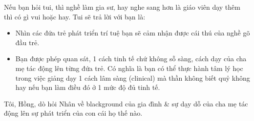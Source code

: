\documentclass[12pt,oneside]{book}
\begin{document}
Nếu bạn hỏi tui, thì nghề làm gia sư, hay nghe sang hơn là giáo viên dạy thêm thì có gì vui hoặc hay. Tui sẽ trả lời với bạn là:
\begin{itemize}
	\item Nhìn các đứa trẻ phát triển trí tuệ bạn sẽ cảm nhận được cái thú của nghề gõ đầu trẻ.
	
	\item Bạn được phép quan sát, 1 cách tinh tế chứ không sỗ sàng, cách dạy của cha mẹ tác động lên từng đứa trẻ. Có nghĩa là bạn có thể thực hành tâm lý học trong việc giảng dạy 1 cách lâm sàng (clinical) mà thần không biết quỷ không hay nếu bạn làm điều đó ở 1 mức độ đủ tinh tế.
\end{itemize}
Tôi, {\sf Hồng}, dò hỏi {\sf Nhân} về blackground của gia đình \& sự dạy dỗ của cha mẹ tác động lên sự phát triển của con cái họ thế nào.
\end{document}
